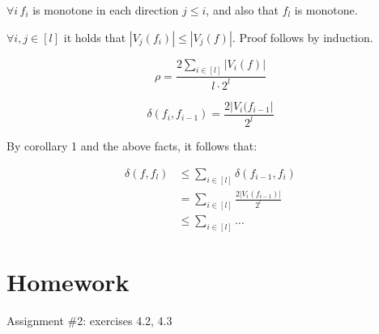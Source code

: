 \documentclass{idc_msc}
\begin{document}
\(\forall i \, f_i\) is monotone in each direction \(j \le i\), and also that \(f_l\) is monotone.

\(\forall i, j \in [l]\) it holds that \(|V_j(f_i)| \le |V_j(f)|\). Proof follows by induction.

\[
\rho = \frac{2 \sum_{i \in [l]} |V_i(f)|}{l \cdot 2^{l}}
\]

\[
  \delta(f_i, f_{i - 1}) = \frac{2 |V_i(f_{i-1}|}{2^l}
\]

By corollary 1 and the above facts, it follows that:

\[
  \begin{aligned}
  \delta(f, f_l) &\le \sum_{i \in [l]} \delta(f_{i-1}, f_i) \\
  &= \sum_{i \in [l]} \frac{2 |V_i(f_{i-1})|}{2^l} \\
  &\le \sum_{i \in [l]} \ldots
  \end{aligned}
\]



\section{Homework}

Assignment \#2: exercises 4.2, 4.3
\end{document}
